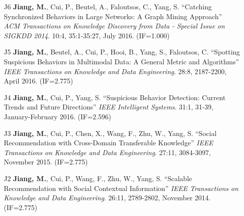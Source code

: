 \documentclass[10pt]{article}
\newenvironment{myindentpar}[1]%
{\begin{list}{}%
         {\setlength{\leftmargin}{#1}}%
         \item[]%
}
{\end{list}}
\newcounter{list}
\begin{document}
\begin{myindentpar}{0.00cm}
\begin{enumerate}[leftmargin=.5cm]
\item[J6] \textbf{Jiang, M.}, Cui, P., Beutel, A., Faloutsos, C., Yang, S. ``Catching Synchronized Behaviors in Large Networks: A Graph Mining Approach'' \textit{ACM Transactions on Knowledge Discovery from Data - Special Issue on SIGKDD 2014}. 10:4, 35:1-35:27, July 2016. (IF=1.000)

\vspace{-0.1cm}

\item[J5] \textbf{Jiang, M.}, Beutel, A., Cui, P., Hooi, B., Yang, S., Faloutsos, C. ``Spotting Suspicious Behaviors in Multimodal Data: A General Metric and Algorithms'' \textit{IEEE Transactions on Knowledge and Data Engineering}. 28:8, 2187-2200, April 2016. (IF=2.775)

\vspace{-0.1cm}

\item[J4] \textbf{Jiang, M.}, Cui, P., Yang, S. ``Suspicious Behavior Detection: Current Trends and Future Directions'' \textit{IEEE Intelligent Systems}. 31:1, 31-39, January-February 2016. (IF=2.596)

\vspace{-0.1cm}

\item[J3] \textbf{Jiang, M.}, Cui, P., Chen, X., Wang, F., Zhu, W., Yang, S. ``Social Recommendation with Cross-Domain Transferable Knowledge'' \textit{IEEE Transactions on Knowledge and Data Engineering}. 27:11, 3084-3097, November 2015. (IF=2.775)

\vspace{-0.1cm}
\vspace{0.15cm}

\item[J2] \textbf{Jiang, M.}, Cui, P., Wang, F., Zhu, W., Yang, S. ``Scalable Recommendation with Social Contextual Information'' \textit{IEEE Transactions on Knowledge and Data Engineering}. 26:11, 2789-2802, November 2014. (IF=2.775)


\end{enumerate}
\end{myindentpar}
\end{document}
